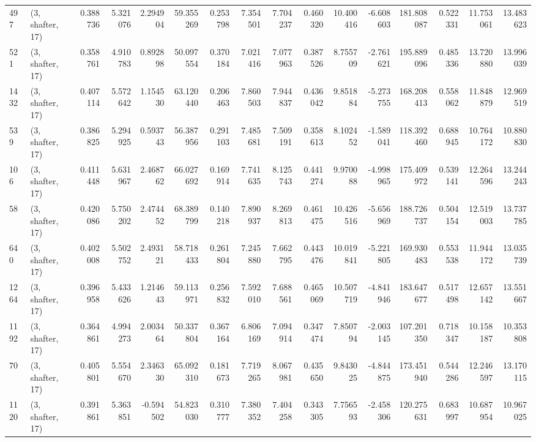 \begin{tabular}{llrrrrrrrrrrrrrr}
497  &  (3, shafter, 17) &   0.388736 &   5.321076 &   2.294904 &     59.355269 &    0.253798 &    7.354501 &    7.704237 &  0.460320 &  10.400416 &  -6.608603 &   181.808087 &   0.522331 &  11.753061 &  13.483623 \\
521  &  (3, shafter, 17) &   0.358761 &   4.910783 &   0.892898 &     50.097554 &    0.370184 &    7.021416 &    7.077963 &  0.387526 &   8.755709 &  -2.761621 &   195.889096 &   0.485336 &  13.720880 &  13.996039 \\
1432 &  (3, shafter, 17) &   0.407114 &   5.572642 &   1.154530 &     63.120440 &    0.206463 &    7.860503 &    7.944837 &  0.436042 &   9.851884 &  -5.273755 &   168.208413 &   0.558062 &  11.848879 &  12.969519 \\
539  &  (3, shafter, 17) &   0.386825 &   5.294925 &   0.593743 &     56.387956 &    0.291103 &    7.485681 &    7.509191 &  0.358613 &   8.102452 &  -1.589041 &   118.392460 &   0.688945 &  10.764172 &  10.880830 \\
106  &  (3, shafter, 17) &   0.411448 &   5.631967 &   2.468762 &     66.027692 &    0.169914 &    7.741635 &    8.125743 &  0.441274 &   9.970088 &  -4.998965 &   175.409972 &   0.539141 &  12.264596 &  13.244243 \\
58   &  (3, shafter, 17) &   0.420086 &   5.750202 &   2.474452 &     68.389799 &    0.140218 &    7.890937 &    8.269813 &  0.461475 &  10.426516 &  -5.656969 &   188.726737 &   0.504154 &  12.519003 &  13.737785 \\
640  &  (3, shafter, 17) &   0.402008 &   5.502752 &   2.493121 &     58.718433 &    0.261804 &    7.245880 &    7.662795 &  0.443476 &  10.019841 &  -5.221805 &   169.930483 &   0.553538 &  11.944172 &  13.035739 \\
1264 &  (3, shafter, 17) &   0.396958 &   5.433626 &   1.214643 &     59.113971 &    0.256832 &    7.592010 &    7.688561 &  0.465069 &  10.507719 &  -4.841946 &   183.647677 &   0.517498 &  12.657142 &  13.551667 \\
1192 &  (3, shafter, 17) &   0.364861 &   4.994273 &   2.003464 &     50.337804 &    0.367164 &    6.806169 &    7.094914 &  0.347474 &   7.850794 &  -2.003145 &   107.201350 &   0.718347 &  10.158187 &  10.353808 \\
70   &  (3, shafter, 17) &   0.405801 &   5.554670 &   2.346330 &     65.092310 &    0.181673 &    7.719265 &    8.067981 &  0.435650 &   9.843025 &  -4.844875 &   173.451940 &   0.544286 &  12.246597 &  13.170115 \\
1120 &  (3, shafter, 17) &   0.391861 &   5.363851 &  -0.594502 &     54.823030 &    0.310777 &    7.380352 &    7.404258 &  0.343305 &   7.756593 &  -2.458306 &   120.275631 &   0.683997 &  10.687954 &  10.967025 \\

\end{tabular}
